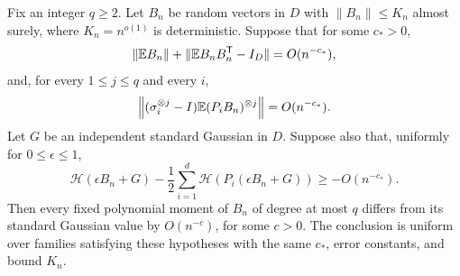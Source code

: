\begin{lemma}\label{ent:gaussian-criterion}
Fix an integer \(q\ge2\). Let \(B_n\) be random vectors in \(D\)
with \(\|B_n\|\le K_n\) almost surely, where \(K_n=n^{o(1)}\) is
deterministic. Suppose that for some \(c_*>0\),
\[
 \|\mathbb E B_n\|+\|\mathbb E B_nB_n^{\mathsf T}-I_D\|=O(n^{-c_*}),
\]
and, for every \(1\le j\le q\) and every \(i\),
\[
 \left\|(\sigma_i^{\otimes j}-I)
              \mathbb E(P_iB_n)^{\otimes j}\right\|=O(n^{-c_*}).
\]
Let \(G\) be an independent standard Gaussian in \(D\). Suppose also
that, uniformly for \(0\le\epsilon\le1\),
\[
 \mathcal H(\epsilon B_n+G)
 -\frac12\sum_{i=1}^d\mathcal H(P_i(\epsilon B_n+G))
 \ge-O(n^{-c_*}).
\]
Then every fixed polynomial moment of \(B_n\) of degree at most
\(q\) differs from its standard Gaussian value by \(O(n^{-c})\),
for some \(c>0\). The conclusion is uniform over families satisfying
these hypotheses with the same \(c_*\), error constants, and bound
\(K_n\).
\end{lemma}


